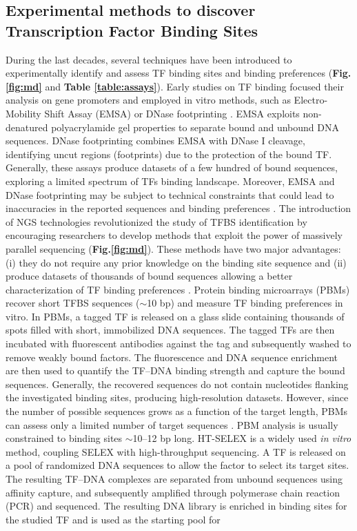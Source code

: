 \documentclass[a4paper, titlepage, openright]{book}
\begin{document}
\subsection{Experimental methods to discover Transcription Factor Binding Sites}
During the last decades, several techniques have been introduced to experimentally identify and assess TF binding sites and binding preferences \citep{jolma2011methods} (\textbf{Fig.\ref{fig:md}} and \textbf{Table \ref{table:assays}}). Early studies on TF binding focused their analysis on gene promoters \citep{stormo2000dna} and employed in vitro methods, such as Electro-Mobility Shift Assay (EMSA) \citep{garner1981gel} or DNase footprinting \citep{galas1978dnaase}. EMSA exploits non-denatured polyacrylamide gel properties to separate bound and unbound DNA sequences. DNase footprinting combines EMSA with DNase I cleavage, identifying uncut regions (footprints) due to the protection of the bound TF. Generally, these assays produce datasets of a few hundred of bound sequences, exploring a limited spectrum of TFs binding landscape. Moreover, EMSA and DNase footprinting may be subject to technical constraints that could lead to inaccuracies in the reported sequences and binding preferences \citep{jolma2011methods}.  The introduction of NGS technologies revolutionized the study of TFBS identification by encouraging researchers to develop methods that exploit the power of massively parallel sequencing (\textbf{Fig.\ref{fig:md}}). These methods have two major advantages: (i) they do not require any prior knowledge on the binding site sequence \citep{jolma2011methods, zia2012towards} and (ii) produce datasets of thousands of bound sequences allowing a better characterization of TF binding preferences \citep{stormo2010determining}. Protein binding microarrays (PBMs) \citep{berger2006compact,berger2009universal} recover short TFBS sequences ($\sim$10 bp) and measure TF binding preferences in vitro. In PBMs, a tagged TF is released on a glass slide containing thousands of spots filled with short, immobilized DNA sequences. The tagged TFs are then incubated with fluorescent antibodies against the tag and subsequently washed to remove weakly bound factors. The fluorescence and DNA sequence enrichment are then used to quantify the TF–DNA binding strength and capture the bound sequences. Generally, the recovered sequences do not contain nucleotides flanking the investigated binding sites, producing high-resolution datasets. However, since the number of possible sequences grows as a function of the target length, PBMs can assess only a limited number of target sequences \citep{jolma2011methods, zia2012towards}. PBM analysis is usually constrained to binding sites $\sim$10–12 bp long. HT-SELEX \citep{jolma2011methods,jolma2010multiplexed} is a widely used \emph{in vitro} method, coupling SELEX with high-throughput sequencing. A TF is released on a pool of randomized DNA sequences to allow the factor to select its target sites. The resulting TF–DNA complexes are separated from unbound sequences using affinity capture, and subsequently amplified through polymerase chain reaction (PCR) and sequenced. The resulting DNA library is enriched in binding sites for the studied TF and is used as the starting pool for 
\end{document}
